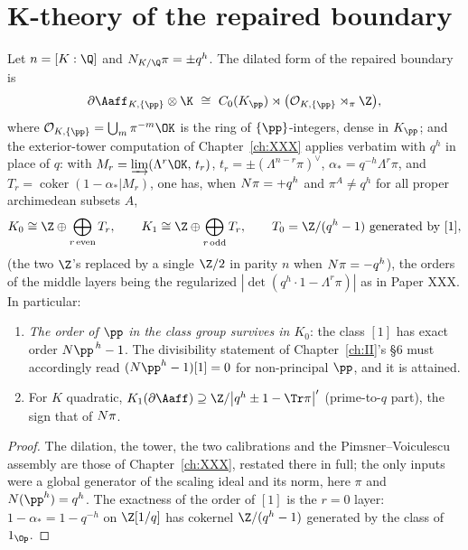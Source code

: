 \section{K-theory of the repaired boundary}\label{XXXI:sec:ktheory}

\begin{theorem}\label{XXXI:thm:ktheory}
Let $n=[K:\Q]$ and $\Ns_{K/\Q}\pi=\pm q^{h}$. The dilated form of the repaired boundary is
\[
\partial\Aaff_{K,\{\pp\}}\otimes\K\ \cong\
C_0(K_\pp)\rtimes\bigl(\mathcal O_{K,\{\pp\}}\rtimes_\pi\Z\bigr),
\]
where $\mathcal O_{K,\{\pp\}}=\bigcup_m\pi^{-m}\OK$ is the ring of $\{\pp\}$-integers,
dense in $K_\pp$; and the exterior-tower computation of Chapter~\ref{ch:XXX} applies verbatim with
$q^h$ in place of $q$: with $M_r=\varinjlim(\Lambda^r\OK,\,t_r)$,
$t_r=\pm(\Lambda^{n-r}\pi)^\vee$, $\alpha_*=q^{-h}\Lambda^r\pi$, and
$T_r=\operatorname{coker}(1-\alpha_*|M_r)$, one has, when $N\pi=+q^h$ and
$\pi^A\ne q^h$ for all proper archimedean subsets $A$,
\[
K_0\cong\Z\oplus\bigoplus_{r\,\mathrm{even}}T_r,\qquad
K_1\cong\Z\oplus\bigoplus_{r\,\mathrm{odd}}T_r,\qquad
T_0=\Z/(q^{h}-1)\ \text{generated by }[1],
\]
(the two $\Z$'s replaced by a single $\Z/2$ in parity $n$ when $N\pi=-q^h$), the orders
of the middle layers being the regularized $|\det(q^h\cdot1-\Lambda^r\pi)|$ as in Paper
XXX. In particular:
\begin{enumerate}
\item \emph{The order of $\pp$ in the class group survives in $K_0$}: the class $[1]$ has
exact order $\Ns\pp^{\,h}-1$. The divisibility statement of Chapter~\ref{ch:II}'s \S6 must
accordingly read $(\Ns\pp^{h}-1)[1]=0$ for non-principal $\pp$, and it is attained.
\item For $K$ quadratic, $K_1(\partial\Aaff)\supseteq\Z/\bigl|q^h\pm1-\Tr\pi\bigr|'$
(prime-to-$q$ part), the sign that of $N\pi$.
\end{enumerate}
\end{theorem}

\begin{proof}
The dilation, the tower, the two calibrations and the Pimsner--Voiculescu \cite{PV} assembly are
those of Chapter~\ref{ch:XXX}, restated there in full; the only inputs were a global generator of the
scaling ideal and its norm, here $\pi$ and $\Ns(\pp^h)=q^h$. The exactness of the order of
$[1]$ is the $r=0$ layer: $1-\alpha_*=1-q^{-h}$ on $\Z[1/q]$ has cokernel $\Z/(q^h-1)$
generated by the class of $1_{\Op}$.
\end{proof}


